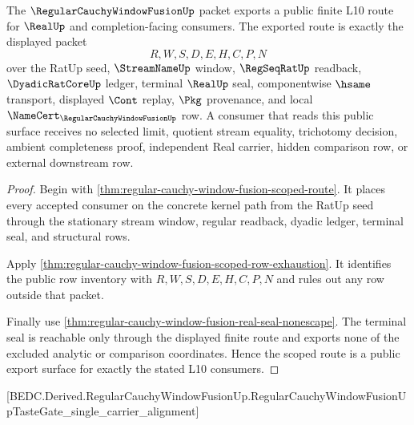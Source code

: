 \begin{theorem}
\label{thm:regular-cauchy-window-fusion-public-export}
The $\RegularCauchyWindowFusionUp$ packet exports a public finite L10 route for $\RealUp$ and completion-facing consumers. The exported route is exactly the displayed packet
$$
R,W,S,D,E,H,C,P,N
$$
over the RatUp seed, $\StreamNameUp$ window, $\RegSeqRatUp$ readback, $\DyadicRatCoreUp$ ledger, terminal $\RealUp$ seal, componentwise $\hsame$ transport, displayed $\Cont$ replay, $\Pkg$ provenance, and local $\NameCert_{\RegularCauchyWindowFusionUp}$ row. A consumer that reads this public surface receives no selected limit, quotient stream equality, trichotomy decision, ambient completeness proof, independent Real carrier, hidden comparison row, or external downstream row.
\end{theorem}
\begin{proof}
Begin with \autoref{thm:regular-cauchy-window-fusion-scoped-route}. It places every accepted consumer on the concrete kernel path from the RatUp seed through the stationary stream window, regular readback, dyadic ledger, terminal seal, and structural rows.

Apply \autoref{thm:regular-cauchy-window-fusion-scoped-row-exhaustion}. It identifies the public row inventory with $R,W,S,D,E,H,C,P,N$ and rules out any row outside that packet.

Finally use \autoref{thm:regular-cauchy-window-fusion-real-seal-nonescape}. The terminal seal is reachable only through the displayed finite route and exports none of the excluded analytic or comparison coordinates. Hence the scoped route is a public export surface for exactly the stated L10 consumers.
\end{proof}

[BEDC.Derived.RegularCauchyWindowFusionUp.RegularCauchyWindowFusionUpTasteGate\_single\_carrier\_alignment]

